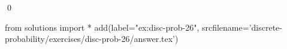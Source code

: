
\begin{ex} 
  \label{ex:disc-prob-26}
  
  \qed
\end{ex} 
\begin{python0}
from solutions import *
add(label="ex:disc-prob-26",
    srcfilename='discrete-probability/exercises/disc-prob-26/answer.tex') 
\end{python0}
